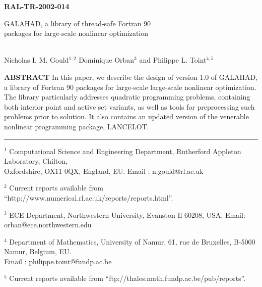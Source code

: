 \documentclass[twoside]{article}
\title{\papertitle}
\author{\paperauthor}
\newcommand{\gal}{{\sf GALAHAD}}
\newcommand{\lan}{{\sf LANCELOT}}
\newcommand{\theabstract}{In this paper, we describe the
design of version 1.0 of \gal, a library of Fortran 90 packages for
large-scale large-scale nonlinear optimization.
The library particularly addresses quadratic programming problems,
containing both interior point and active set variants, as well as
tools for preprocessing such problems prior to solution.
It also contains an updated version of the venerable nonlinear
programming package, \lan.}
\begin{document}
%


\begin{titlepage}

\begin{flushright} {\large \bf RAL-TR-2002-014} \end{flushright}
\vspace*{0.2 cm}

{\LARGE \bf
\begin{center}
\gal, a library of thread-safe Fortran 90 \\
packages for large-scale nonlinear optimization
\end{center}}
\vspace*{0.1 cm}
\begin{center}
\mbox{} \\
      Nicholas I. M. Gould$^{1,2}$
      Dominique Orban$^{3}$
      and
      Philippe L. Toint$^{4,5}$
\\
\end{center}

\vspace{0.4cm}

\begin{center}
\parbox{\textwidth}{
{
{\bf  ABSTRACT \newline}
\theabstract}
}
\end{center}

\vspace{0.2 cm}

\noindent \rule{\textwidth}{0.001in}
\vspace{0.1 cm}

{\small
\begin{description}
\item  $^1$ Computational Science and Engineering Department,
       Rutherford Appleton Laboratory,
       Chilton, \\ Oxfordshire, OX11 0QX, England, EU.
       Email : n.gould@rl.ac.uk
\item  $^2$ Current reports available from %
       ``http://www.numerical.rl.ac.uk/reports/reports.html''.
\item $^3$ ECE Department,  Northwestern University, Evanston Il 60208, USA.
       Email: orban@ece.northwestern.edu
\item  $^4$ Department of Mathematics, University of Namur,
       61, rue de Bruxelles, B-5000 Namur, Belgium, EU. \\
       Email : philippe.toint@fundp.ac.be
\item  $^5$ Current reports available from %
       ``ftp://thales.math.fundp.ac.be/pub/reports''.
\end{description}
}


\end{titlepage}
\end{document}
